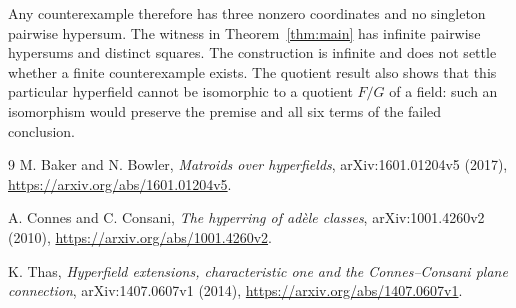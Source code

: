 \documentclass[11pt]{article}
\theoremstyle{remark}
\begin{document}
Any counterexample therefore has three nonzero coordinates and no
singleton pairwise hypersum. The witness in Theorem~\ref{thm:main}
has infinite pairwise hypersums and distinct squares. The construction
is infinite and does not settle whether a finite counterexample exists.
The quotient result also shows that this particular hyperfield cannot
be isomorphic to a quotient $F/G$ of a field: such an isomorphism would
preserve the premise and all six terms of the failed conclusion.

\begin{thebibliography}{9}
M. Baker and N. Bowler,
\emph{Matroids over hyperfields},
arXiv:1601.01204v5 (2017),
\url{https://arxiv.org/abs/1601.01204v5}.

A. Connes and C. Consani,
\emph{The hyperring of ad\`ele classes},
arXiv:1001.4260v2 (2010),
\url{https://arxiv.org/abs/1001.4260v2}.

K. Thas,
\emph{Hyperfield extensions, characteristic one and the Connes--Consani
plane connection},
arXiv:1407.0607v1 (2014),
\url{https://arxiv.org/abs/1407.0607v1}.
\end{thebibliography}
\end{document}
